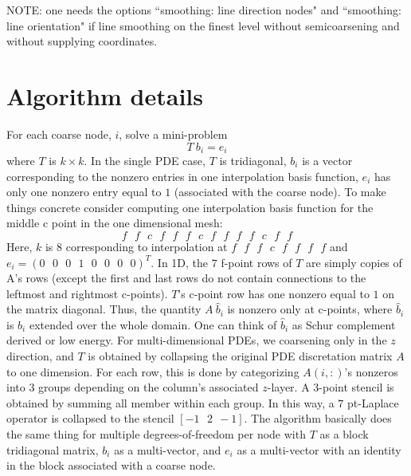 \documentclass{article}[11pt]
\begin{document}
\noindent
NOTE: one needs the options ``smoothing: line direction nodes" and 
      ``smoothing: line orientation" if line smoothing on the finest level
      without semicoarsening and without supplying coordinates.
  

%
\section{Algorithm details}
%
For each coarse node, $i$, solve a mini-problem 
$$
                 T ~b_i = e_i
$$
where $T$ is $k \times k$. In the single PDE case, $T$ is tridiagonal, $b_i$ is a vector 
corresponding to the nonzero entries in one interpolation basis function, 
$e_i$ has only one nonzero entry equal to $1$ (associated with the coarse node).
To make things concrete consider computing one interpolation basis function 
for the middle c point in the one dimensional mesh:
$$
             f~~~f~~~c~~~f~~~f~~~f~~~c~~~f~~~f~~~f~~~f~~~c~~~f~~~f
$$
Here, $k$ is $8$ corresponding to interpolation at  $f~~~f~~~f~~~c~~~f~~~f~~~f~~~f$
and $e_i = (0~~~0~~~0~~~1~~~0~~~0~~~0~~~0)^T$. In 1D, the $7$ f-point rows of $T$ are simply 
copies of A's rows (except the first and last rows do not contain connections
to the leftmost and rightmost c-points). $T$'s c-point row has one nonzero equal
to $1$ on the matrix diagonal. Thus,   the quantity $A~\hat{b}_i$ is nonzero only at c-points,
where $\hat{b}_i$ is $b_i$ extended over the whole domain. One can think of $\hat{b}_i$ as Schur 
complement derived or low energy. For multi-dimensional PDEs, we coarsening 
only in the $z$ direction, and $T$ is obtained by collapsing the original PDE
discretation matrix $A$ to one dimension. 
For each row, this is done by categorizing $A(i,:)$'s nonzeros into $3$ groups
depending on the column's associated $z$-layer. A $3$-point stencil is obtained by
summing all member within each group.  In this way, a $7$ pt-Laplace operator is
collapsed to the stencil $[-1~~~2~~-1]$. The algorithm basically does the same thing
for multiple degrees-of-freedom per node with $T$ as a block tridiagonal matrix,
$b_i$ as a multi-vector, and $e_i$ as a multi-vector with an identity in the block
associated with a coarse node.
\end{document}
